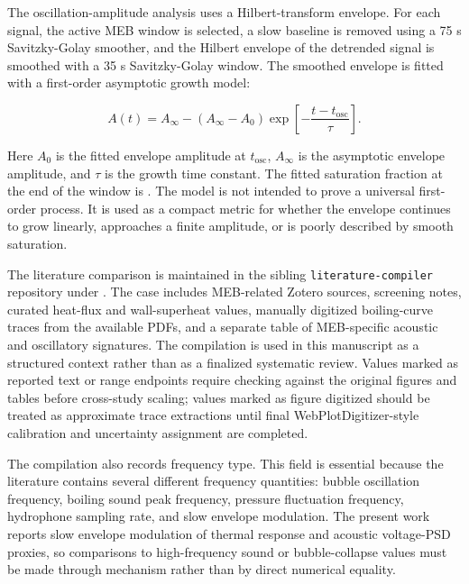 \documentclass[final,1p,times]{elsarticle}
\begin{document}
The oscillation-amplitude analysis uses a Hilbert-transform envelope. For each signal, the active MEB window is selected, a slow baseline is removed using a 75 s Savitzky-Golay smoother, and the Hilbert envelope of the detrended signal is smoothed with a 35 s Savitzky-Golay window. The smoothed envelope is fitted with a first-order asymptotic growth model:

\begin{equation}
A(t) = A_{\infty} - \left(A_{\infty} - A_0\right)\exp\left[-\frac{t-t_{\mathrm{osc}}}{\tau}\right].
\label{eq:envelope}
\end{equation}

Here $A_0$ is the fitted envelope amplitude at $t_{\mathrm{osc}}$, $A_\infty$ is the asymptotic envelope amplitude, and $\tau$ is the growth time constant. The fitted saturation fraction at the end of the window is . The model is not intended to prove a universal first-order process. It is used as a compact metric for whether the envelope continues to grow linearly, approaches a finite amplitude, or is poorly described by smooth saturation.

The literature comparison is maintained in the sibling \texttt{literature-compiler} repository under . The case includes MEB-related Zotero sources, screening notes, curated heat-flux and wall-superheat values, manually digitized boiling-curve traces from the available PDFs, and a separate table of MEB-specific acoustic and oscillatory signatures. The compilation is used in this manuscript as a structured context rather than as a finalized systematic review. Values marked as reported text or range endpoints require checking against the original figures and tables before cross-study scaling; values marked as figure digitized should be treated as approximate trace extractions until final WebPlotDigitizer-style calibration and uncertainty assignment are completed.

The compilation also records frequency type. This field is essential because the literature contains several different frequency quantities: bubble oscillation frequency, boiling sound peak frequency, pressure fluctuation frequency, hydrophone sampling rate, and slow envelope modulation. The present work reports slow envelope modulation of thermal response and acoustic voltage-PSD proxies, so comparisons to high-frequency sound or bubble-collapse values must be made through mechanism rather than by direct numerical equality.
\end{document}
